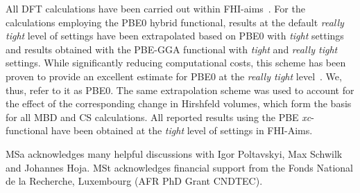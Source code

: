 \documentclass[aps,prl,groupaddress, twocolumn]{revtex4-1}  %
\begin{document}
All DFT calculations have been carried out within FHI-aims~\cite{fhi_aims}. For the calculations employing the PBE0 hybrid functional, results at the default \emph{really tight} level of settings have been extrapolated based on PBE0 with \emph{tight} settings and results obtained with the PBE-GGA functional with \emph{tight} and \emph{really tight} settings. While significantly reducing computational costs, this scheme has been proven to provide an excellent estimate for PBE0 at the \emph{really tight} level~\cite{Hoja2018}. We, thus, refer to it as PBE0. The same extrapolation scheme was used to account for the effect of the corresponding change in Hirshfeld volumes, which form the basis for all MBD and CS calculations. All reported results using the PBE \textit{xc}-functional have been obtained at the \emph{tight} level of settings in FHI-Aims.
	 
\begin{acknowledgements}
 MSa acknowledges many helpful discussions with Igor Poltavskyi, Max Schwilk and Johannes Hoja.
 MSt acknowledges financial support from the Fonds National de la Recherche, Luxembourg (AFR PhD Grant CNDTEC).
\end{acknowledgements}


\end{document}
